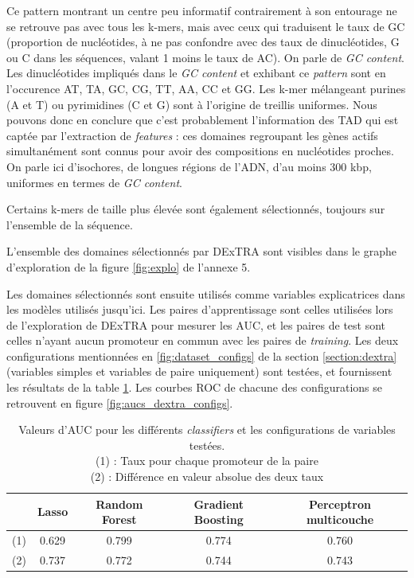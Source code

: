 \documentclass[french]{llncs}
\begin{document}
Ce pattern montrant un centre peu informatif contrairement à son entourage ne se retrouve pas avec tous les k-mers, mais avec ceux qui traduisent le taux de GC (proportion de nucléotides, à ne pas confondre avec des taux de dinucléotides, G ou C dans les séquences, valant 1 moins le taux de AC). On parle de \textit{GC content}. Les dinucléotides impliqués dans le \textit{GC content} et exhibant ce \textit{pattern} sont en l'occurence AT, TA, GC, CG, TT, AA, CC et GG. Les k-mer mélangeant purines (A et T) ou pyrimidines (C et G) sont à l'origine de treillis uniformes.
Nous pouvons donc en conclure que c'est probablement l'information des TAD qui est captée par l'extraction de \textit{features} : ces domaines regroupant les gènes actifs simultanément sont connus pour avoir des compositions en nucléotides proches. On parle ici d'isochores, de longues régions de l'ADN, d'au moins 300 kbp, uniformes en termes de \textit{GC content}.

Certains k-mers de taille plus élevée sont également sélectionnés, toujours sur l'ensemble de la séquence.

L'ensemble des domaines sélectionnés par DExTRA sont visibles dans le graphe d'exploration de la figure  \ref{fig:explo} de l'annexe 5.

Les domaines sélectionnés sont ensuite utilisés comme variables explicatrices dans les modèles utilisés jusqu'ici. Les paires d'apprentissage sont celles utilisées lors de l'exploration de DExTRA pour mesurer les AUC, et les paires de test sont celles n'ayant aucun promoteur en commun avec les paires de \textit{training}. Les deux configurations mentionnées en \ref{fig:dataset_configs} de la section \ref{section:dextra} (variables simples et variables de paire uniquement) sont testées, et fournissent les résultats de la table \ref{tab_aucs_dexter}. Les courbes ROC de chacune des configurations se retrouvent en figure \ref{fig:aucs_dextra_configs}.

\begin{table}[ht]
 \begin{center}
   \begin{tabular}{l | c c c c}
   \hline
                & Lasso & Random Forest & Gradient Boosting & Perceptron multicouche \\
   \hline
    (1) & 0.629        & 0.799   &    0.774 & 0.760\\
    (2) & 0.737        & 0.772   &    0.744 & 0.743\\
   \hline
   \end{tabular}
   
\caption{Valeurs d'AUC pour les différents \textit{classifiers} et les configurations de variables testées.\\
(1) : Taux pour chaque promoteur de la paire\\(2) : Différence en valeur absolue des deux taux}  \label{tab_aucs_dexter}
 \end{center}
\end{table}
\end{document}
